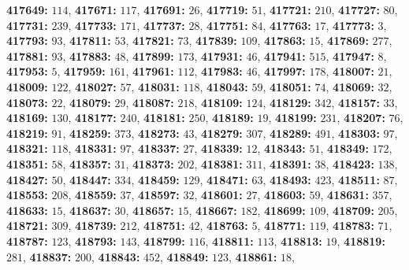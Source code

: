 \textsf{\bfseries 417649:} $114$, \textsf{\bfseries 417671:} $117$, \textsf{\bfseries 417691:} $26$, \textsf{\bfseries 417719:} $51$, \textsf{\bfseries 417721:} $210$, \textsf{\bfseries 417727:} $80$, \textsf{\bfseries 417731:} $239$, \textsf{\bfseries 417733:} $171$, \textsf{\bfseries 417737:} $28$, \textsf{\bfseries 417751:} $84$, \textsf{\bfseries 417763:} $17$, \textsf{\bfseries 417773:} $3$, \textsf{\bfseries 417793:} $93$, \textsf{\bfseries 417811:} $53$, \textsf{\bfseries 417821:} $73$, \textsf{\bfseries 417839:} $109$, \textsf{\bfseries 417863:} $15$, \textsf{\bfseries 417869:} $277$, \textsf{\bfseries 417881:} $93$, \textsf{\bfseries 417883:} $48$, \textsf{\bfseries 417899:} $173$, \textsf{\bfseries 417931:} $46$, \textsf{\bfseries 417941:} $515$, \textsf{\bfseries 417947:} $8$, \textsf{\bfseries 417953:} $5$, \textsf{\bfseries 417959:} $161$, \textsf{\bfseries 417961:} $112$, \textsf{\bfseries 417983:} $46$, \textsf{\bfseries 417997:} $178$, \textsf{\bfseries 418007:} $21$, \textsf{\bfseries 418009:} $122$, \textsf{\bfseries 418027:} $57$, \textsf{\bfseries 418031:} $118$, \textsf{\bfseries 418043:} $59$, \textsf{\bfseries 418051:} $74$, \textsf{\bfseries 418069:} $32$, \textsf{\bfseries 418073:} $22$, \textsf{\bfseries 418079:} $29$, \textsf{\bfseries 418087:} $218$, \textsf{\bfseries 418109:} $124$, \textsf{\bfseries 418129:} $342$, \textsf{\bfseries 418157:} $33$, \textsf{\bfseries 418169:} $130$, \textsf{\bfseries 418177:} $240$, \textsf{\bfseries 418181:} $250$, \textsf{\bfseries 418189:} $19$, \textsf{\bfseries 418199:} $231$, \textsf{\bfseries 418207:} $76$, \textsf{\bfseries 418219:} $91$, \textsf{\bfseries 418259:} $373$, \textsf{\bfseries 418273:} $43$, \textsf{\bfseries 418279:} $307$, \textsf{\bfseries 418289:} $491$, \textsf{\bfseries 418303:} $97$, \textsf{\bfseries 418321:} $118$, \textsf{\bfseries 418331:} $97$, \textsf{\bfseries 418337:} $27$, \textsf{\bfseries 418339:} $12$, \textsf{\bfseries 418343:} $51$, \textsf{\bfseries 418349:} $172$, \textsf{\bfseries 418351:} $58$, \textsf{\bfseries 418357:} $31$, \textsf{\bfseries 418373:} $202$, \textsf{\bfseries 418381:} $311$, \textsf{\bfseries 418391:} $38$, \textsf{\bfseries 418423:} $138$, \textsf{\bfseries 418427:} $50$, \textsf{\bfseries 418447:} $334$, \textsf{\bfseries 418459:} $129$, \textsf{\bfseries 418471:} $63$, \textsf{\bfseries 418493:} $423$, \textsf{\bfseries 418511:} $87$, \textsf{\bfseries 418553:} $208$, \textsf{\bfseries 418559:} $37$, \textsf{\bfseries 418597:} $32$, \textsf{\bfseries 418601:} $27$, \textsf{\bfseries 418603:} $59$, \textsf{\bfseries 418631:} $357$, \textsf{\bfseries 418633:} $15$, \textsf{\bfseries 418637:} $30$, \textsf{\bfseries 418657:} $15$, \textsf{\bfseries 418667:} $182$, \textsf{\bfseries 418699:} $109$, \textsf{\bfseries 418709:} $205$, \textsf{\bfseries 418721:} $309$, \textsf{\bfseries 418739:} $212$, \textsf{\bfseries 418751:} $42$, \textsf{\bfseries 418763:} $5$, \textsf{\bfseries 418771:} $119$, \textsf{\bfseries 418783:} $71$, \textsf{\bfseries 418787:} $123$, \textsf{\bfseries 418793:} $143$, \textsf{\bfseries 418799:} $116$, \textsf{\bfseries 418811:} $113$, \textsf{\bfseries 418813:} $19$, \textsf{\bfseries 418819:} $281$, \textsf{\bfseries 418837:} $200$, \textsf{\bfseries 418843:} $452$, \textsf{\bfseries 418849:} $123$, \textsf{\bfseries 418861:} $18$, 

